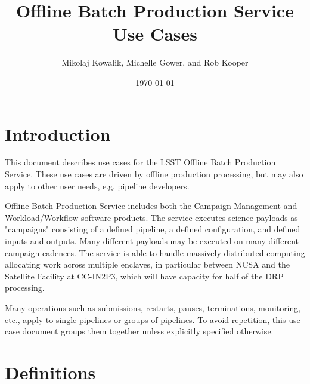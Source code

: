 \documentclass[DM,lsstdraft,toc]{lsstdoc}
\title{Offline Batch Production Service Use Cases}
\author{Mikolaj Kowalik, Michelle Gower, and Rob Kooper}
\date{\today}
\begin{document}
\maketitle

\section{Introduction}

This document describes use cases for the LSST Offline Batch Production
Service.  These use cases are driven by offline production processing, but may
also apply to other user needs, e.g. pipeline developers.

Offline Batch Production Service includes both the Campaign Management and
Workload/Workflow software products.  The service executes science payloads as
"campaigns" consisting of a defined pipeline, a defined configuration, and
defined inputs and outputs.  Many different payloads may be executed on many
different campaign cadences.  The service is able to handle massively
distributed computing allocating work across multiple enclaves, in particular
between NCSA and the Satellite Facility at CC-IN2P3, which will have capacity
for half of the DRP processing.

Many operations such as submissions, restarts, pauses, terminations,
monitoring, etc., apply to single pipelines or groups of pipelines.  To avoid
repetition, this use case document groups them together unless explicitly
specified otherwise.

\section{Definitions}
\end{document}
